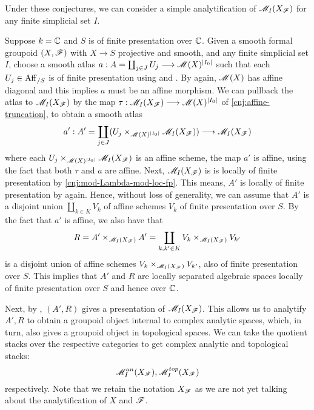 \documentclass[11pt]{amsart}
\begin{document}
Under these conjectures, we can consider a simple analytification of
$\mathscr{M}_I(X_\mathscr{F})$ for any finite simplicial set $I$.

\begin{cns}\label{cns:analytification-mod-st-quiv-bun-formal-grpd}
Suppose $k = \mathbb{C}$ and $S$ is of finite presentation over $\mathbb{C}$.
Given a smooth formal groupoid $(X, \mathscr{F})$ with $X \to S$ projective and smooth,
and any finite simplicial set $I$, choose a smooth atlas
$a : A = \coprod_{j \in J} U_j \to \sM(X)^{|I_0|}$ such that
each $U_j \in \mathrm{Aff}_{/S}$ is of finite presentation using
\cite[Theorem 1.0.1]{Wang-BunG} and
\cite[\href{https://stacks.math.columbia.edu/tag/04YF}{Lemma
04YF}]{stacks-project}.
By \cite[Theorem 1.0.1]{Wang-BunG} again, $\mathscr{M}(X)$ has affine
diagonal and this implies $a$ must be an affine morphism.
We can pullback the atlas to $\mathscr{M}_I(X_\mathscr{F})$ by the map
$\tau : \sM_I(X_\sF) \to \sM(X)^{|I_0|}$ of \cref{cnj:affine-truncation},
to obtain a smooth atlas
\[
a' : A' = \coprod_{j \in J} (U_j \times_{\sM(X)^{|I_0|}} \sM_I(X_\sF))
  \to \sM_I(X_\sF)
\]
where each $U_j \times_{\mathscr{M}(X)^{|I_0|}} \mathscr{M}_I(X_\mathscr{F})$ is an affine scheme,
the map $a'$ is affine, using the fact that both $\tau$ and $a$ are affine.
Next, $\mathscr{M}_I(X_\mathscr{F})$ is is locally of finite presentation by
\cref{cnj:mod-Lambda-mod-loc-fp}. This means, $A'$ is locally of finite
presentation by
\cite[\href{https://stacks.math.columbia.edu/tag/04YF}{Lemma
04YF}]{stacks-project}
again. Hence, without loss of generality, we can assume that
$A'$ is a disjoint union $\coprod_{k \in K} V_k$ of affine schemes $V_k$ of
finite presentation over $S$. By the fact that $a'$ is affine, we also have that
\[
R = A' \times_{\mathscr{M}_I(X_\mathscr{F})} A' =
\coprod_{k, k' \in K} V_k \times_{\mathscr{M}_I(X_\mathscr{F})} V_{k'}
\]
is a disjoint union of affine schemes $V_k \times_{\mathscr{M}_I(X_\mathscr{F})} V_{k'}$,
also of finite presentation over $S$. This implies that $A'$ and
$R$ are locally separated algebraic spaces locally of finite presentation over
$S$ and hence over $\mathbb{C}$.

Next, by
\cite[\href{https://stacks.math.columbia.edu/tag/04T5}{Lemma 04T5}]
{stacks-project},
$(A', R)$ gives a presentation of $\mathscr{M}_I(X_\mathscr{F})$.
This allows us to analytify $A', R$ to obtain a groupoid object internal
to complex analytic spaces, which, in turn, also gives a groupoid object in
topological spaces. We can take the quotient
stacks over the respective categories to get complex analytic and topological
stacks:
\[
\mathscr{M}_I^{an}(X_\mathscr{F}), \mathscr{M}_I^{top}(X_\mathscr{F})
\]
respectively. Note that we retain the notation $X_\mathscr{F}$ as we are not yet talking
about the analytification of $X$ and $\mathscr{F}$.
\end{cns}
\end{document}
